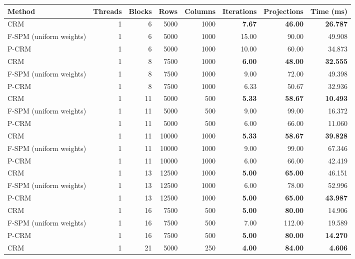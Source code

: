 \begin{tabular}{lrrrrrrr}
\toprule
Method & Threads & Blocks & Rows & Columns & Iterations & Projections & Time (ms) \\
\midrule
CRM & 1 & 6 & 5000 & 1000 & \textbf{7.67} & \textbf{46.00} & \textbf{26.787} \\
F-SPM (uniform weights) & 1 & 6 & 5000 & 1000 & 15.00 & 90.00 & 49.908 \\
P-CRM & 1 & 6 & 5000 & 1000 & 10.00 & 60.00 & 34.873 \\
\midrule
CRM & 1 & 8 & 7500 & 1000 & \textbf{6.00} & \textbf{48.00} & \textbf{32.555} \\
F-SPM (uniform weights) & 1 & 8 & 7500 & 1000 & 9.00 & 72.00 & 49.398 \\
P-CRM & 1 & 8 & 7500 & 1000 & 6.33 & 50.67 & 32.936 \\
\midrule
CRM & 1 & 11 & 5000 & 500 & \textbf{5.33} & \textbf{58.67} & \textbf{10.493} \\
F-SPM (uniform weights) & 1 & 11 & 5000 & 500 & 9.00 & 99.00 & 16.372 \\
P-CRM & 1 & 11 & 5000 & 500 & 6.00 & 66.00 & 11.060 \\
\midrule
CRM & 1 & 11 & 10000 & 1000 & \textbf{5.33} & \textbf{58.67} & \textbf{39.828} \\
F-SPM (uniform weights) & 1 & 11 & 10000 & 1000 & 9.00 & 99.00 & 67.346 \\
P-CRM & 1 & 11 & 10000 & 1000 & 6.00 & 66.00 & 42.419 \\
\midrule
CRM & 1 & 13 & 12500 & 1000 & \textbf{5.00} & \textbf{65.00} & 46.151 \\
F-SPM (uniform weights) & 1 & 13 & 12500 & 1000 & 6.00 & 78.00 & 52.996 \\
P-CRM & 1 & 13 & 12500 & 1000 & \textbf{5.00} & \textbf{65.00} & \textbf{43.987} \\
\midrule
CRM & 1 & 16 & 7500 & 500 & \textbf{5.00} & \textbf{80.00} & 14.906 \\
F-SPM (uniform weights) & 1 & 16 & 7500 & 500 & 7.00 & 112.00 & 19.589 \\
P-CRM & 1 & 16 & 7500 & 500 & \textbf{5.00} & \textbf{80.00} & \textbf{14.270} \\
\midrule
CRM & 1 & 21 & 5000 & 250 & \textbf{4.00} & \textbf{84.00} & \textbf{4.606} \\

\end{tabular}
